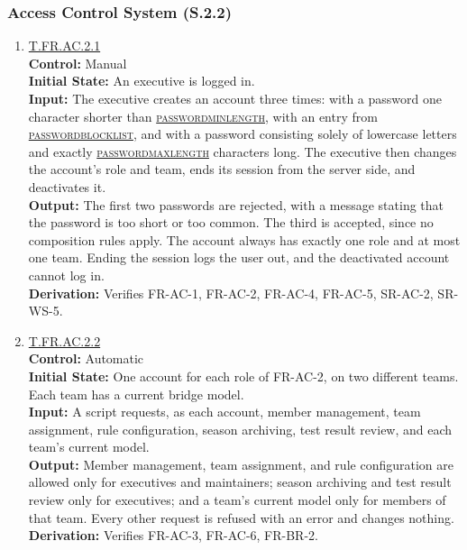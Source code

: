 \documentclass[12pt, titlepage]{article}
\newcommand{\testdef}[1]{\leavevmode\hypertarget{test:#1}{}\hyperlink{trace:#1}{#1}}
\DeclareRobustCommand{\cname}[1]{{\renewcommand{\_}{\textunderscore\allowbreak}\textsc{#1}}}
\newcommand{\constfirst}[1]{\leavevmode\hypertarget{constfirst:\detokenize{#1}}{}\hyperlink{const:\detokenize{#1}}{\cname{#1}}}
\begin{document}
\subsubsection{Access Control System (S.2.2)}

\begin{enumerate}

\item \testdef{T.FR.AC.2.1}\\
\textbf{Control:} Manual\\
\textbf{Initial State:} An executive is logged in.\\
\textbf{Input:} The executive creates an account three times: with a password
one character shorter than \constfirst{password\_min\_length}, with an entry from
\constfirst{password\_blocklist}, and with a password consisting solely of lowercase letters
 and exactly \constfirst{password\_max\_length} characters long. The executive then changes the
account's role and team, ends its session from the server side, and deactivates
it.\\
\textbf{Output:} The first two passwords are rejected, with a message stating
that the password is too short or too common. The third is accepted, since no
composition rules apply. The account always has exactly one role and at most one
team. Ending the session logs the user out, and the deactivated account cannot
log in.\\
\textbf{Derivation:} Verifies FR-AC-1, FR-AC-2, FR-AC-4, FR-AC-5, SR-AC-2,
SR-WS-5.

\item \testdef{T.FR.AC.2.2}\\
\textbf{Control:} Automatic\\
\textbf{Initial State:} One account for each role of FR-AC-2, on two different
teams. Each team has a current bridge model.\\
\textbf{Input:} A script requests, as each account, member management, team
assignment, rule configuration, season archiving, test result review, and each
team's current model.\\
\textbf{Output:} Member management, team assignment, and rule configuration are
allowed only for executives and maintainers; season archiving and test result
review only for executives; and a team's current model only for members of that
team. Every other request is refused with an error and changes nothing.\\
\textbf{Derivation:} Verifies FR-AC-3, FR-AC-6, FR-BR-2.

\end{enumerate}
\end{document}
